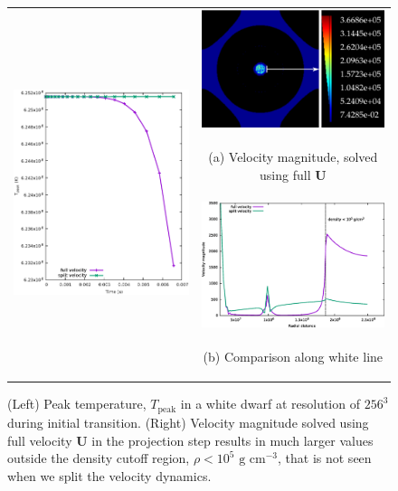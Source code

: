 \begin{figure}[htb]
\begin{center}
\begin{tabular}{l c}
\multirow{4}{3.25in}[30mm]{ \includegraphics[width=3.0in]{./figs/wdconvect_256_splitU} } & \multicolumn{1}{c}{\includegraphics[width=2.35in]{./figs/magvel_full_XY}} \\
& \multicolumn{1}{c}{\begin{footnotesize} (a) Velocity magnitude, solved using full $\mathbf{U}$ \end{footnotesize}} \\[1.em]
& \multicolumn{1}{c}{\includegraphics[width=2.75in]{./figs/magvel_lineout_X}} \\ 
& \multicolumn{1}{c}{\begin{footnotesize} (b) Comparison along white line \end{footnotesize}} \\
\end{tabular}
\caption{\label{fig:wdconvect_splitU} (Left) Peak temperature, $T_{\text{peak}}$ in a white dwarf at resolution of $256^3$ 
         during initial transition. (Right) Velocity magnitude solved using full velocity $\mathbf{U}$ in the projection step 
         results in much larger values outside the density cutoff region, $\rho < 10^5 \text{ g cm}^{-3}$, that is not seen when 
         we split the velocity dynamics.}
\end{center}
\end{figure}

